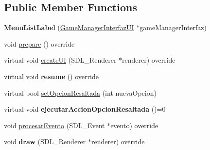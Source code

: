 \subsection*{Public Member Functions}
\begin{DoxyCompactItemize}
\item 
{\bfseries Menu\+List\+Label} (\hyperlink{class_game_manager_interfaz_u_i}{Game\+Manager\+Interfaz\+UI} $\ast$game\+Manager\+Interfaz)\hypertarget{class_menu_list_label_a1b63e875b7833876e771ea0bb09b56ba}{}\label{class_menu_list_label_a1b63e875b7833876e771ea0bb09b56ba}

\item 
void \hyperlink{class_menu_list_label_aaa91bf445c3db2fa2008a06b5e96df24}{prepare} () override
\item 
virtual void \hyperlink{class_menu_list_label_aa4622ae2bc0bf7d31aa8fe8483103e27}{create\+UI} (S\+D\+L\+\_\+\+Renderer $\ast$renderer) override
\item 
virtual void {\bfseries resume} () override\hypertarget{class_menu_list_label_adf653340269ada2e89b343ce37669d7d}{}\label{class_menu_list_label_adf653340269ada2e89b343ce37669d7d}

\item 
virtual bool \hyperlink{class_menu_list_label_aa4b43b15d99168836a26ce8e9cf996a6}{set\+Opcion\+Resaltada} (int nueva\+Opcion)
\item 
virtual void {\bfseries ejecutar\+Accion\+Opcion\+Resaltada} ()=0\hypertarget{class_menu_list_label_ab24db858c8bec69186a40b10670ac752}{}\label{class_menu_list_label_ab24db858c8bec69186a40b10670ac752}

\item 
void \hyperlink{class_menu_list_label_a7fb1ac75f91fe00f38706f74f6148cd6}{procesar\+Evento} (S\+D\+L\+\_\+\+Event $\ast$evento) override
\item 
void {\bfseries draw} (S\+D\+L\+\_\+\+Renderer $\ast$renderer) override\hypertarget{class_menu_list_label_a5fb48d986e1ea0f85428d3f52e98ef57}{}\label{class_menu_list_label_a5fb48d986e1ea0f85428d3f52e98ef57}

\end{DoxyCompactItemize}
